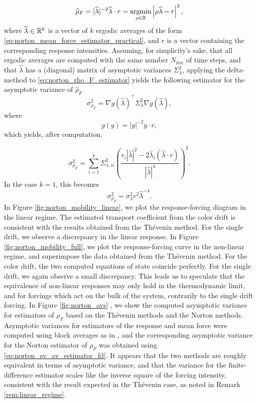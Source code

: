 \begin{equation}
    \label{eq:norton_rho_F_estimator}
    \widehat{\rho}_F= |\widehat{\lambda}|^{-2}\widehat{\lambda}\cdot r= \underset{\rho \in \mathbb{R}}{\mathrm{argmin}} \left| \rho\widehat{\lambda} - r\right|^2,
\end{equation}
where $\widehat{\lambda} \in \mathbb{R}^k$ is a vector of $k$ ergodic averages of the form \eqref{eq:norton_mean_force_estimator_practical}, and $r$ is a vector containing the corresponding response intensities.
Assuming, for simplicity's sake, that all ergodic averages are computed with the same number $N_{\mathrm{iter}}$ of time steps, and that $\widehat{\lambda}$ has a (diagonal) matrix of asymptotic variances $\Sigma_\lambda^2$, applying the delta-method to \eqref{eq:norton_rho_F_estimator} yields
the following estimator for the asymptotic variance of $\widehat{\rho}_F$
\[
\sigma^2_{\rho_F}= \nabla g(\widehat{\lambda})^\intercal \Sigma^2_\lambda\nabla g(\widehat{\lambda}),
\]
where 
\[g(y)=|y|^{-2}y\cdot r,\]
which yields, after computation,

\begin{equation}
    \label{eq:norton_sv_av_estimator}
    \sigma^2_{\rho_F} = \sum_{i=1}^k \Sigma_{\lambda,ii}^2\left(\frac{r_i|\widehat{\lambda}|^2-2\widehat{\lambda}_i(\widehat{\lambda}\cdot r)}{|\widehat{\lambda}|^4}\right)^2.
\end{equation}
In the case $k=1$, this becomes
\begin{equation}
    \label{eq:norton_sv_av_estimator_fd}
    \sigma^2_{\rho_F}=\sigma_{\lambda}^2 r^2\widehat{\lambda}^{-4}.
\end{equation}
In Figure \ref{fig:norton_mobility_linear}, we plot the response-forcing diagram in the linear regime. 
The estimated transport coefficient from the color drift is consistent with the results obtained from the Thévenin method. For the single drift, we observe a discrepancy in the linear response.
In Figure \ref{fig:norton_mobility_full}, we plot the response-forcing curve in the non-linear regime, and superimpose the data obtained from the Thévenin method. 
For the color drift, the two computed equations of state coincide perfectly. For the single drift, we again observe a small discrepancy.
This leads us to speculate that the equivalence of non-linear responses may only hold in the thermodynamic limit, and for forcings which act on the bulk of the system, contrarily to the single drift forcing.
In Figure \ref{fig:norton_avs} , we show the computed asymptotic variance for estimators of $\rho_F$ based on the Thévenin methods and the Norton methods. 
Asymptotic variances for estimators of the response and mean force were computed using block averages as in \cite{FP89}, and the corresponding asymptotic variance for the Norton estimator of $\rho_F$ was obtained using \eqref{eq:norton_sv_av_estimator_fd}.
It appears that the two methods are roughly equivalent in terms of asymptotic variance, and that the variance for the finite-difference estimator scales like the inverse square of the forcing intensity, consistent with the result expected in the Thévenin case, as noted in Remark \ref{rem:linear_regime}.

